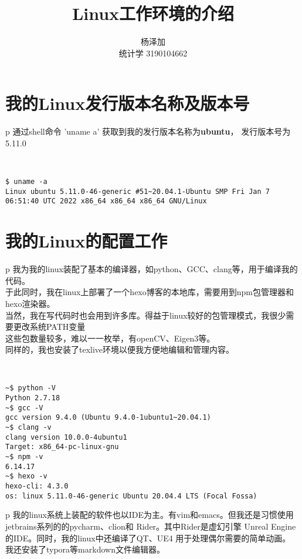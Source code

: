 \documentclass{ctexart}
\title{Linux工作环境的介绍}
\author{杨泽加 \\ 统计学 3190104662}
\begin{document}
    

    \maketitle
    \section{我的Linux发行版本名称及版本号}\label{S1}
    \begin{tabular}{p\columnwidth}
        通过shell命令 'uname \-a' 获取到我的发行版本名称为\textbf{ubuntu}，
        发行版本号为 5.11.0
    \end{tabular}\\
    \begin{lstlisting}
$ uname -a
Linux ubuntu 5.11.0-46-generic #51~20.04.1-Ubuntu SMP Fri Jan 7 06:51:40 UTC 2022 x86_64 x86_64 x86_64 GNU/Linux
    \end{lstlisting}
    \section{我的Linux的配置工作}\label{S2}
    \begin{tabular}{p\columnwidth}
        我为我的linux装配了基本的编译器，如python、GCC、clang等，用于编译我的代码。\\
        于此同时，我在linux上部署了一个hexo博客的本地库，需要用到npm包管理器和hexo渲染器。\\
        当然，我在写代码时也会用到许多库。得益于linux较好的包管理模式，我很少需要更改系统PATH变量\\
        这些包数量较多，难以一一枚举，有openCV\cite{openCV.org}、Eigen3等。\\
        同样的，我也安装了texlive环境以便我方便地编辑和管理内容。\cite{patashnik1984bibtex}
    \end{tabular}\\
    \begin{lstlisting}
~$ python -V
Python 2.7.18
~$ gcc -V
gcc version 9.4.0 (Ubuntu 9.4.0-1ubuntu1~20.04.1)
~$ clang -v
clang version 10.0.0-4ubuntu1
Target: x86_64-pc-linux-gnu
~$ npm -v
6.14.17
~$ hexo -v
hexo-cli: 4.3.0
os: linux 5.11.0-46-generic Ubuntu 20.04.4 LTS (Focal Fossa)
    \end{lstlisting}
    \begin{tabular}{p\columnwidth}
        我的linux系统上装配的软件也以IDE为主。有vim和emacs。但我还是习惯使用
        jetbrains系列的的pycharm、clion和 Rider。其中Rider是虚幻引擎
        Unreal Engine的IDE。同时，我的linux中还编译了QT、UE4
        用于处理偶尔需要的简单动画。\\
        我还安装了typora等markdown文件编辑器。
    \end{tabular}
\end{document}
